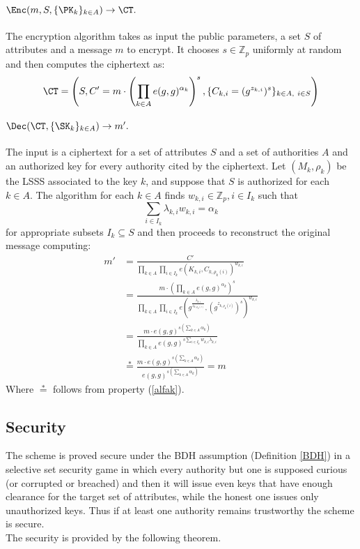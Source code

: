   \paragraph*{$\Enc(m, S, \{\PK_k\}_{k \in A}) \rightarrow \CT.$}
    The encryption algorithm takes as input the public parameters, a set $S$ of attributes and a message $m$ to encrypt.
    It chooses $s \in \mathbb{Z}_p$ uniformly at random and then computes the ciphertext as:
    $$
      \CT = \left(S, C' = m \cdot \left(\prod_{k\in A} e(g,g)^{\alpha_k} \right)^s, \{C_{k,i} = (g^{z_{k, i}})^s\}_{k\in A, ~i \in S} \right)
    $$

  \paragraph*{$\Dec(\CT, \{\SK_k\}_{k\in A})  \rightarrow m'.$}
    The input is a ciphertext for a set of attributes $S$ and a set of authorities $A$ and an authorized key for every authority cited by the ciphertext.
    Let $(M_k, \rho_k)$ be the LSSS associated to the key $k$, and suppose that $S$ is authorized for each $k \in A$.
    The algorithm for each $k\in A$ finds $w_{k,i} \in \mathbb{Z}_p, i \in I_k$ such that
    \begin{equation}
      \label{alfak}
      \sum_{i \in I_k} \lambda_{k, i} w_{k, i} = \alpha_k
    \end{equation}
    for appropriate subsets $I_k \subseteq S$ and then proceeds to reconstruct the original message computing:
    \begin{align*}
      m' & = \frac{C'}{\prod_{k \in A} \prod_{i \in I_k} e(K_{k, i}, C_{k, \rho_{k}(i)})^{w_{k,i}}} \\
& = \frac{m \cdot \left(\prod_{k \in A} e(g,g)^{\alpha_k} \right)^s}{\prod_{k \in A} \prod_{i \in I_k} e\left(g^{\frac{\lambda_{k,i}}{z_{k, \rho_{k}(i)}}}, (g^{z_{k, \rho_{k}(i)}})^s\right)^{w_{k,i}}} \nonumber \\
& = \frac{m \cdot e(g, g)^{s(\sum_{k\in A}\alpha_k)}}{\prod_{k \in A} e(g, g)^{s \sum_{i\in I_k} w_{k, i} \lambda_{k, i}}} \nonumber \\
& \stackrel{*}{=} \frac{m \cdot e(g, g)^{s(\sum_{k\in A}\alpha_k)}}{e(g, g)^{s (\sum_{k\in A}\alpha_k)}} = m
\end{align*}
    Where $\stackrel{*}{=}$ follows from property (\ref{alfak}).

\subsection{Security}
  The scheme is proved secure under the BDH assumption (Definition \ref{BDH}) in a selective set security game in which every authority but one is supposed curious (or corrupted or breached) and then it will issue even keys that have enough clearance for the target set of attributes, while the honest one issues only unauthorized keys.
  Thus if at least one authority remains trustworthy the scheme is secure.\\
  The security  is provided by the following theorem.

